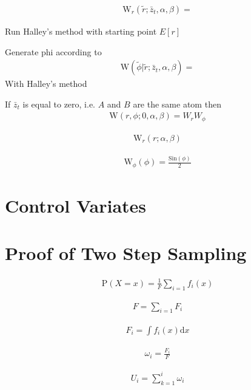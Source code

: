 \documentclass{revtex4}
\begin{document}
  \begin{align}
    \mathrm{W}_{r}\left(\tilde{r}; \bar{z}_t, \alpha, \beta\right) = 
  \end{align}

  Run Halley's method with starting point $E[r]$

  Generate phi according to 
  \begin{align}
    \mathrm{W}\left(\tilde{\phi} | \tilde{r}; \bar{z}_t, \alpha, \beta\right) = 
  \end{align}
  With Halley's method

  If $\bar{z}_t$ is equal to zero, i.e. $A$ and $B$ are the same atom then
  \begin{align}
    \mathrm{W}\left(r, \phi; 0, \alpha, \beta\right) = W_{r} W_{\phi}
  \end{align}

  \begin{align}
    \mathrm{W}_{r}\left(r; \alpha, \beta\right)
  \end{align}

  \begin{align}
    \mathrm{W}_{\phi}\left(\phi\right) = \frac{\mathrm{Sin}(\phi)}{2}
  \end{align}

\section{Control Variates}

\section{Proof of Two Step Sampling}
  \begin{align}
    \mathrm{P}(X=x) = \frac{1}{F}\sum_{i=1}f_i(x)
  \end{align}

  \begin{align}
    F = \sum_{i=1} F_i
  \end{align}

  \begin{align}
    F_i = \int f_i(x) \mathrm{d}x
  \end{align}

  \begin{align}
    \omega_i = \frac{F_i}{F}
  \end{align}

  \begin{align}
    U_i = \sum_{k=1}^{i} \omega_i
  \end{align}
\end{document}
